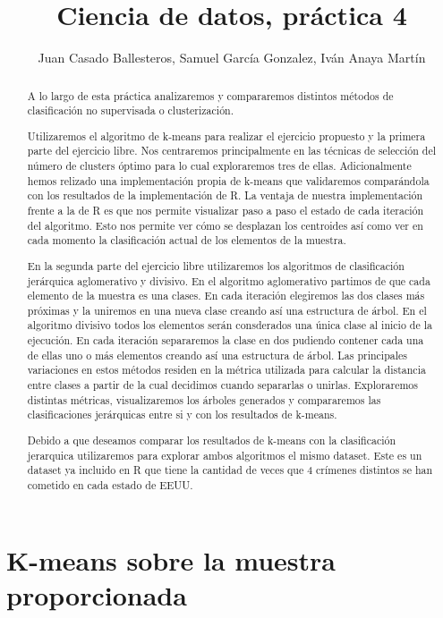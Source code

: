 \documentclass [a4paper] {article}
\title{Ciencia de datos, práctica 4}
\author{Juan Casado Ballesteros, Samuel García Gonzalez, Iván Anaya Martín}
\begin{document}
\maketitle

\begin{abstract}
A lo largo de esta práctica analizaremos y compararemos distintos métodos de clasificación no supervisada o clusterización.

Utilizaremos el algoritmo de k-means para realizar el ejercicio propuesto y la primera parte del ejercicio libre.
Nos centraremos principalmente en las técnicas de selección del número de clusters óptimo para lo cual exploraremos tres de ellas.
Adicionalmente hemos relizado una implementación propia de k-means que validaremos comparándola con los resultados de la implementación de R.
La ventaja de nuestra implementación frente a la de R es que nos permite visualizar paso a paso el estado de cada iteración del algoritmo.
Esto nos permite ver cómo se desplazan los centroides así como ver en cada momento la clasificación actual de los elementos de la muestra.

En la segunda parte del ejercicio libre utilizaremos los algoritmos de clasificación jerárquica aglomerativo y divisivo.
En el algoritmo aglomerativo partimos de que cada elemento de la muestra es una clases.
En cada iteración elegiremos las dos clases más próximas y la uniremos en una nueva clase creando así una estructura de árbol.
En el algoritmo divisivo todos los elementos serán consderados una única clase al inicio de la ejecución.
En cada iteración separaremos la clase en dos pudiendo contener cada una de ellas uno o más elementos creando así una estructura de árbol.
Las principales variaciones en estos métodos residen en la métrica utilizada para calcular la distancia entre clases a partir de la cual decidimos cuando separarlas o unirlas.
Exploraremos distintas métricas, visualizaremos los árboles generados y compararemos las clasificaciones jerárquicas entre si y con los resultados de k-means.

Debido a que deseamos comparar los resultados de k-means con la clasificación jerarquica utilizaremos para explorar ambos algoritmos el mismo dataset.
Este es un dataset ya incluido en R que tiene la cantidad de veces que 4 crímenes distintos se han cometido en cada estado de EEUU.
\end{abstract}

\newpage
\tableofcontents


\newpage
\section{K-means sobre la muestra proporcionada}
\end{document}
